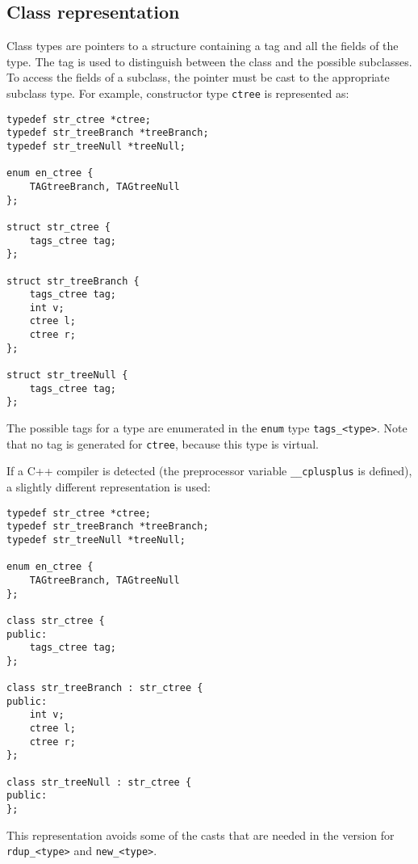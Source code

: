 \subsection{Class representation}
Class types are pointers to a structure containing
a tag and all the fields of the type.
The tag is used to distinguish between the class and the possible
subclasses. To access the fields of a subclass, the pointer must
be cast to the appropriate subclass type.
For example, constructor type \texttt{ctree} is represented as:
\begin{showfile}
\begin{verbatim}
typedef str_ctree *ctree;
typedef str_treeBranch *treeBranch;
typedef str_treeNull *treeNull;

enum en_ctree {
    TAGtreeBranch, TAGtreeNull
};

struct str_ctree {
    tags_ctree tag;
};

struct str_treeBranch {
    tags_ctree tag;
    int v;
    ctree l;
    ctree r;
};

struct str_treeNull {
    tags_ctree tag;
};
\end{verbatim}
\end{showfile}
The possible tags for a type are enumerated in the \texttt{enum} type
\texttt{tags\_<type>}. Note that no tag is generated for \texttt{ctree},
because this type is virtual.
\par
If a C++ compiler is detected (the preprocessor variable \verb'__cplusplus' 
is defined), a slightly different representation is used:
\begin{showfile}
\begin{verbatim}
typedef str_ctree *ctree;
typedef str_treeBranch *treeBranch;
typedef str_treeNull *treeNull;

enum en_ctree {
    TAGtreeBranch, TAGtreeNull
};

class str_ctree {
public:
    tags_ctree tag;
};

class str_treeBranch : str_ctree {
public:
    int v;
    ctree l;
    ctree r;
};

class str_treeNull : str_ctree {
public:
};
\end{verbatim}
\end{showfile}
This representation avoids some of the casts that are needed in the {\C}
version for \verb'rdup_<type>' and \verb'new_<type>'.
